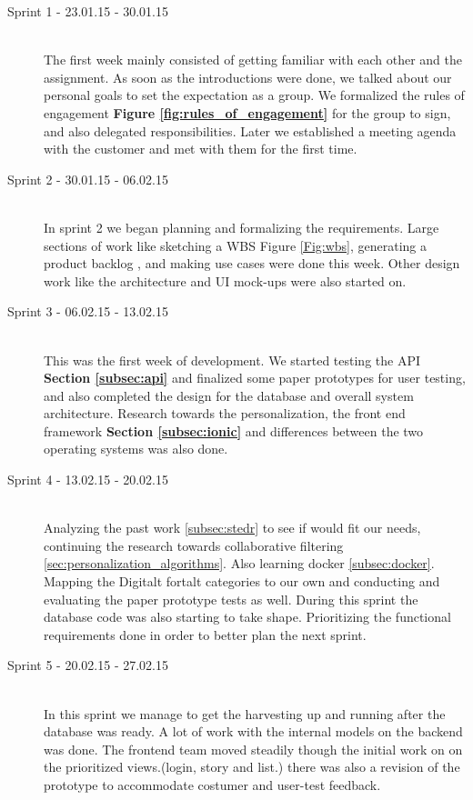 \begin{description}
	
	\item[Sprint 1 - 23.01.15 - 30.01.15] \hfill \\ 
	The first week mainly consisted of getting familiar with each other and the assignment. As soon as the introductions were done, we talked about our personal goals to set the expectation as a group. We formalized the rules of engagement \textbf{Figure \ref{fig:rules_of_engagement}} for the group to sign, and also delegated responsibilities. Later we established a meeting agenda with the customer and met with them for the first time.
	
	\item[Sprint 2 - 30.01.15 - 06.02.15] \hfill \\ 
	In sprint 2 we began planning and formalizing the requirements. Large sections of work like sketching a WBS {Figure \ref{Fig:wbs}}, generating a product backlog , and making use cases were done this week. Other design work like the architecture and UI mock-ups were also started on.
	
	\item[Sprint 3 - 06.02.15 - 13.02.15] \hfill \\ 
	This was the first week of development. We started testing the API \textbf{Section \ref{subsec:api}} and finalized some paper prototypes for user testing,  and also completed the design for the database and overall system architecture. Research towards the personalization, the front end framework \textbf{Section \ref{subsec:ionic}}  and differences between the two operating systems  was also done. 
	
	\item[Sprint 4 - 13.02.15 - 20.02.15] \hfill \\ 
	Analyzing the past work \ref{subsec:stedr} to see if would fit our needs, continuing the research towards collaborative filtering \ref{sec:personalization_algorithms}. Also learning docker \ref{subsec:docker}. Mapping the Digitalt fortalt  categories to our own and conducting and evaluating the paper prototype tests as well. During this sprint the database code was also starting to take shape. Prioritizing the functional requirements done in order to better plan the next sprint.  
	
	\item[Sprint 5 - 20.02.15 - 27.02.15] \hfill \\ 
	In this sprint we manage to get the harvesting up and running after the database was ready. A lot of work with the internal models on the backend was done. The frontend team moved steadily though the initial work on on the prioritized views.(login, story and list.) there was also a revision of the prototype to accommodate costumer and user-test feedback.
		

\end{description}
